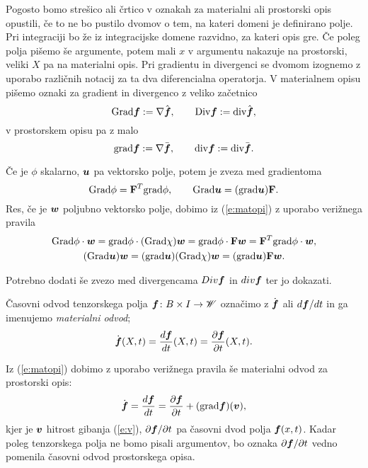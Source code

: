 Pogosto bomo strešico ali črtico v oznakah za materialni ali prostorski opis opustili,
če to ne bo pustilo dvomov o tem, na kateri domeni je definirano polje.
Pri integraciji bo že iz integracijske domene razvidno, za kateri opis gre.
Če poleg polja pišemo še argumente, potem mali $x$ v argumentu nakazuje na prostorski,
veliki $X$ pa na materialni opis.
Pri gradientu in divergenci se dvomom izognemo z uporabo različnih notacij
za ta dva diferencialna operatorja.
V materialnem opisu pišemo oznaki za gradient in divergenco z veliko začetnico
\[ \mathrm{Grad}\boldsymbol f:=\nabla\hat{\boldsymbol f},\qquad \mathrm {Div}\boldsymbol f:=\mathrm{div}\hat{\boldsymbol f}, \]
v prostorskem opisu pa z malo
\[ \mathrm{grad}\boldsymbol f:=\nabla\bar{\boldsymbol f},\qquad \mathrm{div}\boldsymbol f:=\mathrm{div}\bar{\boldsymbol f}. \]

Če je $\phi$ skalarno, $\boldsymbol u$ pa vektorsko polje, potem je zveza med gradientoma
\begin{equation}\label{e:gz}
	\mathrm{Grad}\phi=\mathbf F^{T}\mathrm{grad}\phi,\qquad \mathrm{Grad}\boldsymbol u=(\mathrm{grad}\boldsymbol u)\mathbf F.
\end{equation}
Res, če je $\boldsymbol w$ poljubno vektorsko polje, dobimo iz (\ref{e:matopi})
z uporabo verižnega pravila
\begin{gather*}
	\mathrm{Grad}\phi\cdot\boldsymbol w=\mathrm{grad}\phi\cdot(\mathrm{Grad}\chi)\boldsymbol w=
	\mathrm{grad}\phi\cdot \mathbf F\boldsymbol w=\mathbf F^{T}\mathrm{grad}\phi\cdot\boldsymbol w, \\
	(\mathrm{Grad}\boldsymbol u)\boldsymbol w=(\mathrm{grad}\boldsymbol u)(\mathrm{Grad}\chi)\boldsymbol w
	=(\mathrm{grad}\boldsymbol u)\mathbf F\boldsymbol w.
\end{gather*}

\textcolor[rgb]{1,0,0}{Potrebno dodati še zvezo med divergencama $Div\boldsymbol f$ in $div\boldsymbol f$ ter jo dokazati.}

\begin{definicija}
	Časovni odvod tenzorskega polja $\boldsymbol f\colon B\times I\to\mathscr W$ označimo z
	$\dot{\boldsymbol f}$ ali $d\boldsymbol f/dt$ in ga imenujemo \emph{materialni odvod};
	\[ \dot{\boldsymbol f}(X,t)=\frac{d\boldsymbol f}{dt}(X,t)=\frac{\partial\boldsymbol f}{\partial t}(X,t). \]
\end{definicija}
Iz (\ref{e:matopi}) dobimo z uporabo verižnega pravila še materialni odvod za prostorski opis:
\begin{equation} \label{e:matodv}
	\dot{\boldsymbol f}=\frac{d\boldsymbol f}{dt}=
	\frac{\partial\boldsymbol f}{\partial t}+(\mathrm{grad}\boldsymbol f)(\boldsymbol v),
\end{equation}
kjer je $\boldsymbol v$ hitrost gibanja (\ref{e:v}), $\partial\boldsymbol f/\partial t$ pa
časovni dvod polja $\boldsymbol f(x,t)$. Kadar poleg tenzorskega polja ne bomo pisali argumentov,
bo oznaka $\partial\boldsymbol f/\partial t$ vedno pomenila časovni odvod prostorskega opisa.

